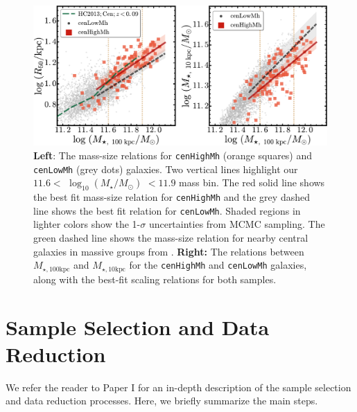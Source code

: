 \documentclass[a4paper,fleqn,usenatbib]{mnras}
\def\rbcg{\texttt{cenHighMh}}
\def\nbcg{\texttt{cenLowMh}}
\def\logms{{$\log_{10} (M_{\star}/M_{\odot})$}}
\def\minn{{$M_{\star,10\mathrm{kpc}}$}}
\def\mtot{{$M_{\star,100\mathrm{kpc}}$}}
\begin{document}
  \begin{figure}
      \centering 
      \includegraphics[width=\textwidth]{fig/redbcg_scaling_relation}
      \caption{
          \textbf{Left}: The mass-size relations for \rbcg{} (orange squares) and 
          \nbcg{} (grey dots) galaxies. 
          Two vertical lines highlight our $11.6<$ \logms{} $<11.9$ mass bin. 
          The red solid line shows the best fit mass-size relation for \rbcg{} and the 
          grey dashed line shows the best fit relation for \nbcg{}. 
          Shaded regions in lighter colors show the 1-$\sigma$ uncertainties
          from MCMC sampling.  
          The green dashed line shows the mass-size relation for nearby central 
          galaxies in massive groups from \citet{HCompany13}. 
          \textbf{Right:} The relations between \mtot{} and \minn{} for the 
          \rbcg{} and \nbcg{} galaxies, along with the best-fit scaling relations for 
          both samples.
          }
      \label{fig:scaling_relation} 
  \end{figure}

\section{Sample Selection and Data Reduction}
    \label{sec:data}
    
    We refer the reader to Paper I for an in-depth description of the sample selection 
    and data reduction processes. 
    Here, we briefly summarize the main steps.
    
\end{document}
